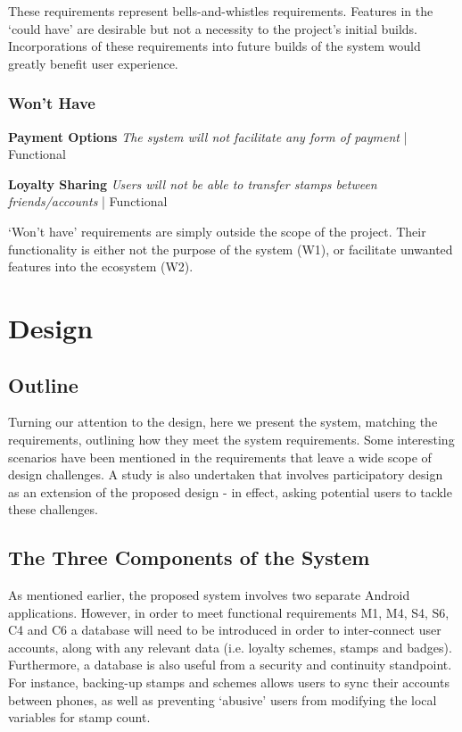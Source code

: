 These requirements represent bells-and-whistles requirements. Features in the `could have' are desirable but not a necessity to the project's initial builds. Incorporations of these requirements into future builds of the system would greatly benefit user experience.

\subsubsection{Won't Have}
\begin{description}[leftmargin=!,labelwidth=\widthof{\bfseries Medium}]
    \item[W1] \textbf{Payment Options} \newline
        \textit{The system will not facilitate any form of payment}  | Functional  
        
    \item[W2] \textbf{Loyalty Sharing} \newline
        \textit{Users will not be able to transfer stamps between friends/accounts}  | Functional 
\end{description}

`Won't have' requirements are simply outside the scope of the project. Their functionality is either not the purpose of the system (W1), or facilitate unwanted features into the ecosystem (W2). 






\clearpage{}
\section{Design}
\subsection{Outline}
Turning our attention to the design, here we present the system, matching the requirements, outlining how they meet the system requirements. Some interesting scenarios have been mentioned in the requirements that leave a wide scope of design challenges. A study is also undertaken that involves participatory design as an extension of the proposed design - in effect, asking potential users to tackle these challenges.


\subsection{The Three Components of the System}
As mentioned earlier, the proposed system involves two separate Android applications. However, in order to meet functional requirements M1, M4, S4, S6, C4 and C6 a database will need to be introduced in order to inter-connect user accounts, along with any relevant data (i.e. loyalty schemes, stamps and badges). Furthermore, a database is also useful from a security and continuity standpoint. For instance, backing-up stamps and schemes allows users to sync their accounts between phones, as well as preventing `abusive' users from modifying the local variables for stamp count.

